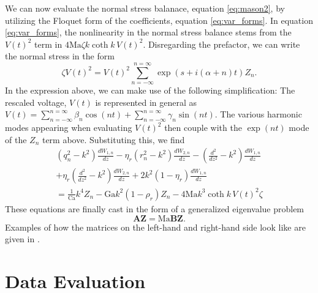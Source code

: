 \documentclass{jfm_arxiv}
\renewcommand\vec{\mathbf}
\newcommand{\matr}[1]{\bm{#1}}     %
\newcommand{\Ma}{\text{Ma}}
\newcommand{\Ca}{\text{Ca}}
\newcommand{\Ga}{\text{Ga}}
\begin{document}
We can now evaluate the normal stress balanace, equation \eqref{eq:mason2}, by utilizing the Floquet form of the coefficients, equation \eqref{eq:var_forms}.
In equation \eqref{eq:var_forms}, the nonlinearity in the normal stress balance stems from the $V(t)^2$ term in $4\Ma \zeta k \coth k \, V(t)^2$.
Disregarding the prefactor, we can write the normal stress in the form
\begin{equation}
\zeta V(t)^2 = V(t)^2 \sum_{n=-\infty}^{n=\infty} \exp\left(s+i(\alpha + n)t \right)Z_n.
\end{equation}
In the expression above, we can make use of the following simplification: The rescaled voltage, $V(t)$ is represented in general as $V(t) = \sum_{n=-\infty}^{n=\infty} \beta_n \cos(nt) + \sum_{n=-\infty}^{n=\infty}\gamma_n \sin(nt)$.
The various harmonic modes appearing when evaluating $V(t)^2$ then couple with the $\exp(nt)$ mode of the $Z_n$ term above.
Substituting this, we find 
\begin{equation}
  \begin{split}
  \left( q_n^2 - k^2\right) \frac{d W_{1,n}}{dz}
  -\eta_r\left( r_n^2 - k^2\right) \frac{d W_{2,n}}{dz}
  -\left( \frac{d^2}{dz^2} - k^2\right)\frac{dW_{1,n}}{dz}
\\  +\eta_r\left(\frac{d^2}{dz^2} -k^2\right)\frac{dW_{2,n}}{dz}
  +2k^2\left(1-\eta_r \right)\frac{dW_{1,n}}{dz}
\\  =
  \frac{1}{\Ca}k^4Z_n
  -\Ga k^2\left(1-\rho_r \right)Z_n
  -4\Ma k^3\coth k\,V(t)^2 \zeta
  \end{split}
  \label{eq:norm_str_fin}
  \end{equation}
These equations are finally cast in the form of a generalized eigenvalue problem
\begin{equation}
\matr{A} \vec{Z} = \textrm{Ma} \matr{B} \vec{Z}.
\end{equation}
Examples of how the matrices on the left-hand and right-hand side look like are given in \citet{Bandopadhyay2017}.

\section{Data Evaluation}
\label{sec:appC-eval}
\end{document}
